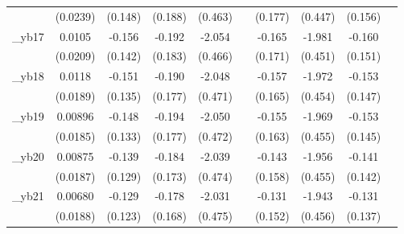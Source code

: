\begin{table}[htbp]
\begin{tabular}{l*{9}{c}}
            &    (0.0239)         &     (0.148)         &     (0.188)         &     (0.463)         &                     &     (0.177)         &     (0.447)         &     (0.156)         &                     \\
[1em]
\_yb17       &      0.0105         &      -0.156         &      -0.192         &      -2.054\sym{***}&                     &      -0.165         &      -1.981\sym{***}&      -0.160         &                     \\
            &    (0.0209)         &     (0.142)         &     (0.183)         &     (0.466)         &                     &     (0.171)         &     (0.451)         &     (0.151)         &                     \\
[1em]
\_yb18       &      0.0118         &      -0.151         &      -0.190         &      -2.048\sym{***}&                     &      -0.157         &      -1.972\sym{***}&      -0.153         &                     \\
            &    (0.0189)         &     (0.135)         &     (0.177)         &     (0.471)         &                     &     (0.165)         &     (0.454)         &     (0.147)         &                     \\
[1em]
\_yb19       &     0.00896         &      -0.148         &      -0.194         &      -2.050\sym{***}&                     &      -0.155         &      -1.969\sym{***}&      -0.153         &                     \\
            &    (0.0185)         &     (0.133)         &     (0.177)         &     (0.472)         &                     &     (0.163)         &     (0.455)         &     (0.145)         &                     \\
[1em]
\_yb20       &     0.00875         &      -0.139         &      -0.184         &      -2.039\sym{***}&                     &      -0.143         &      -1.956\sym{***}&      -0.141         &                     \\
            &    (0.0187)         &     (0.129)         &     (0.173)         &     (0.474)         &                     &     (0.158)         &     (0.455)         &     (0.142)         &                     \\
[1em]
\_yb21       &     0.00680         &      -0.129         &      -0.178         &      -2.031\sym{***}&                     &      -0.131         &      -1.943\sym{***}&      -0.131         &                     \\
            &    (0.0188)         &     (0.123)         &     (0.168)         &     (0.475)         &                     &     (0.152)         &     (0.456)         &     (0.137)         &                     \\

\end{tabular}
\end{table}
